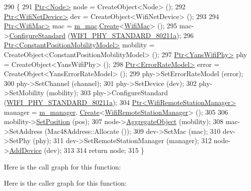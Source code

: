 \begin{DoxyCode}
290 \{
291   \hyperlink{classns3_1_1Ptr}{Ptr<Node>} node = CreateObject<Node> ();
292   \hyperlink{classns3_1_1Ptr}{Ptr<WifiNetDevice>} dev = CreateObject<WifiNetDevice> ();
293 
294   \hyperlink{classns3_1_1Ptr}{Ptr<WifiMac>} mac = \hyperlink{classInterferenceHelperSequenceTest_ac01570a00a54e92493699f76e7dc29db}{m\_mac}.\hyperlink{classns3_1_1ObjectFactory_a18152e93f0a6fe184ed7300cb31e9896}{Create}<\hyperlink{classns3_1_1WifiMac}{WifiMac}> ();
295   mac->\hyperlink{classns3_1_1WifiMac_a16ec5352c804df83e42159ab4e2e73d8}{ConfigureStandard} (\hyperlink{group__wifi_gga1299834f4e1c615af3ca738033b76a49a22db1e8022db2c3450414b86c77b11e4}{WIFI\_PHY\_STANDARD\_80211a});
296   \hyperlink{classns3_1_1Ptr}{Ptr<ConstantPositionMobilityModel>} mobility = 
      CreateObject<ConstantPositionMobilityModel> ();
297   \hyperlink{classns3_1_1Ptr}{Ptr<YansWifiPhy>} phy = CreateObject<YansWifiPhy> ();
298   \hyperlink{classns3_1_1Ptr}{Ptr<ErrorRateModel>} error = CreateObject<YansErrorRateModel> ();
299   phy->SetErrorRateModel (error);
300   phy->SetChannel (channel);
301   phy->SetDevice (dev);
302   phy->SetMobility (mobility);
303   phy->ConfigureStandard (\hyperlink{group__wifi_gga1299834f4e1c615af3ca738033b76a49a22db1e8022db2c3450414b86c77b11e4}{WIFI\_PHY\_STANDARD\_80211a});
304   \hyperlink{classns3_1_1Ptr}{Ptr<WifiRemoteStationManager>} manager = \hyperlink{classInterferenceHelperSequenceTest_a8b2a30399b0e12456e64bbb378ef5c5c}{m\_manager}.
      \hyperlink{classns3_1_1ObjectFactory_a18152e93f0a6fe184ed7300cb31e9896}{Create}<\hyperlink{classns3_1_1WifiRemoteStationManager}{WifiRemoteStationManager}> ();
305 
306   mobility->\hyperlink{classns3_1_1MobilityModel_ac584b3d5a309709d2f13ed6ada1e7640}{SetPosition} (pos);
307   node->\hyperlink{classns3_1_1Object_a79dd435d300f3deca814553f561a2922}{AggregateObject} (mobility);
308   mac->SetAddress (Mac48Address::Allocate ());
309   dev->SetMac (mac);
310   dev->SetPhy (phy);
311   dev->SetRemoteStationManager (manager);
312   node->\hyperlink{classns3_1_1Node_a42ff83ee1d5d1649c770d3f5b62375de}{AddDevice} (dev);
313 
314   \textcolor{keywordflow}{return} node;
315 \}
\end{DoxyCode}


Here is the call graph for this function\+:




Here is the caller graph for this function\+:


